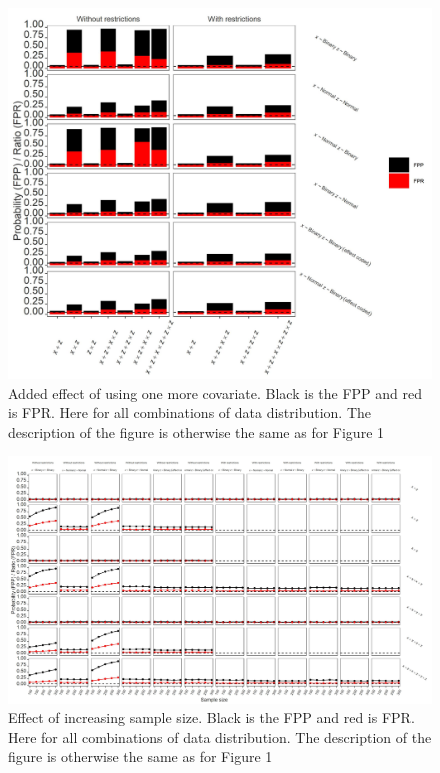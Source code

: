 \begin{figure}[t]
\includegraphics{R/Analysis/Result/Figures/Figure1CSI.jpeg}
\centering
\caption{Added effect of using one more covariate. Black is the FPP and red is FPR.  Here for all combinations of data distribution. The description of the figure is otherwise the same as for Figure 1}
\label{fig:mainfigure}
\end{figure}

\begin{figure}[t]
\includegraphics{R/Analysis/Result/Figures/Figure1DSI.jpeg}
\centering
\caption{Effect of increasing sample size. Black is the FPP and red is FPR.  Here for all combinations of data distribution. The description of the figure is otherwise the same as for Figure 1}
\label{fig:mainfigure}
\end{figure}